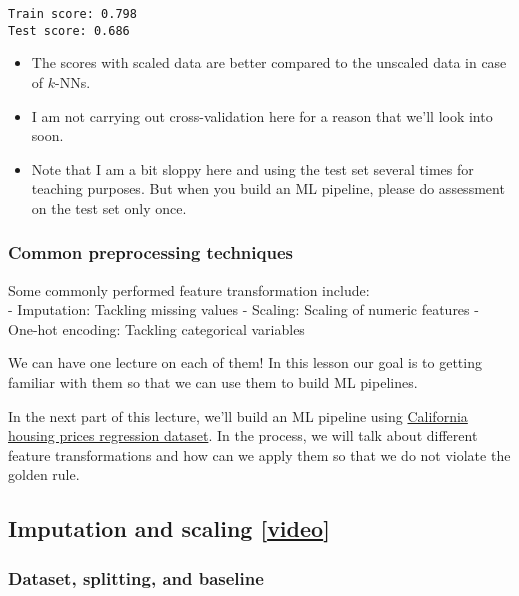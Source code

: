 \documentclass[11pt]{article}
\providecommand{\tightlist}{%
      \setlength{\itemsep}{0pt}\setlength{\parskip}{0pt}}
\begin{document}
    \begin{Verbatim}[commandchars=\\\{\}]
Train score: 0.798
Test score: 0.686
    \end{Verbatim}

    \begin{itemize}
\tightlist
\item
  The scores with scaled data are better compared to the unscaled data
  in case of \(k\)-NNs.
\item
  I am not carrying out cross-validation here for a reason that we'll
  look into soon.
\item
  Note that I am a bit sloppy here and using the test set several times
  for teaching purposes. But when you build an ML pipeline, please do
  assessment on the test set only once.
\end{itemize}

    \subsubsection{Common preprocessing
techniques}\label{common-preprocessing-techniques}

Some commonly performed feature transformation include:\\
- Imputation: Tackling missing values - Scaling: Scaling of numeric
features - One-hot encoding: Tackling categorical variables

We can have one lecture on each of them! In this lesson our goal is to
getting familiar with them so that we can use them to build ML
pipelines.

    In the next part of this lecture, we'll build an ML pipeline using
\href{https://www.kaggle.com/harrywang/housing}{California housing
prices regression dataset}. In the process, we will talk about different
feature transformations and how can we apply them so that we do not
violate the golden rule.

    

    \subsection{\texorpdfstring{Imputation and scaling
{[}\href{https://youtu.be/G2IXbVzKlt8}{video}{]}}{Imputation and scaling {[}video{]}}}\label{imputation-and-scaling-video}

    \subsubsection{Dataset, splitting, and
baseline}\label{dataset-splitting-and-baseline}
\end{document}
